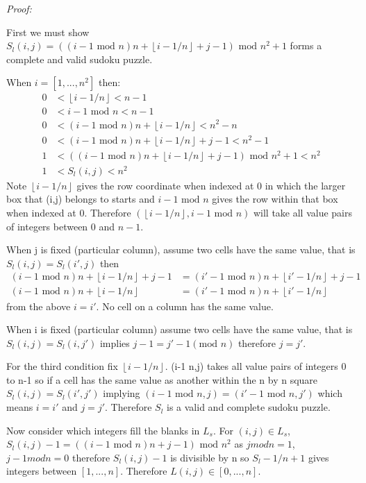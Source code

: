 \documentclass[a4paper,11pt]{report}
\newcounter{row}
\newcounter{col}
\begin{document}
\textit{Proof:}

First we must show $S_l(i,j)=((i-1 \text{ mod } n)n + \left\lfloor{i-1/n}\right\rfloor+j-1)\text{ mod } n^2 +1$ forms a complete and valid sudoku puzzle.

When $i=[1,...,n^2]$ then:
\begin{align}
	0&<\left\lfloor{i-1/n}\right\rfloor<n-1\\
	0&<i-1 \text{ mod } n<n-1\\
	0&<(i-1 \text{ mod } n)n + \left\lfloor{i-1/n}\right\rfloor<n^2-n\\
	0&<(i-1 \text{ mod } n)n + \left\lfloor{i-1/n}\right\rfloor+j-1<n^2-1\\
	1&<((i-1 \text{ mod } n)n + \left\lfloor{i-1/n}\right\rfloor+j-1)\text{ mod } n^2 +1<n^2\\
	1&<S_l(i,j)<n^2
\end{align} 
Note $\left\lfloor{i-1/n}\right\rfloor$ gives the row coordinate when indexed at 0 in which the larger box that (i,j) belongs to starts and $i-1 \text{ mod } n$ gives the row within that box when indexed at 0. Therefore $(\left\lfloor{i-1/n}\right\rfloor,i-1 \text{ mod } n)$ will take all value pairs of integers between 0 and $n-1$.

When j is fixed (particular column), assume two cells have the same value, that is $S_l(i,j)=S_l(i',j)$ then
\begin{align}
(i-1 \text{ mod } n)n + \left\lfloor{i-1/n}\right\rfloor+j-1 &= (i'-1 \text{ mod } n)n +
\left\lfloor{i'-1/n}\right\rfloor+j-1\\
	(i-1 \text{ mod } n)n + \left\lfloor{i-1/n}\right\rfloor &= (i'-1 \text{ mod } n)n + \left\lfloor{i'-1/n}\right\rfloor
\end{align}
from the above $i=i'$. No cell on a column has the same value.

When i is fixed (particular column) assume two cells have the same value, that is $S_l(i,j)=S_l(i,j')$ implies $j-1=j'-1 (\text{mod }n)$ therefore $j=j'$.

For the third condition fix $\left\lfloor{i-1/n}\right\rfloor$. (i-1  n,j) takes all value pairs of integers 0 to n-1 so if a cell has the same value as another within the n by n square $S_l(i,j)=S_l(i',j')$ implying $(i-1 \text{ mod }n,j)=(i'-1 \text{ mod } n,j')$ which means $i=i'$ and $j=j'$. Therefore $S_l$ is a valid and complete sudoku puzzle.

Now consider which integers fill the blanks in $L_s$. For $(i,j)\in L_s$, $S_l(i,j)-1= ((i-1 \text{ mod } n)n+j-1)\text{ mod } n^2$ as $j mod n=1$, $j-1modn=0$ therefore $S_l(i,j)-1$ is divisible by n so $S_l-1/n+1$ gives integers between $[1,...,n]$.
Therefore $L(i,j) \in [0,...,n]$.
\end{document}
